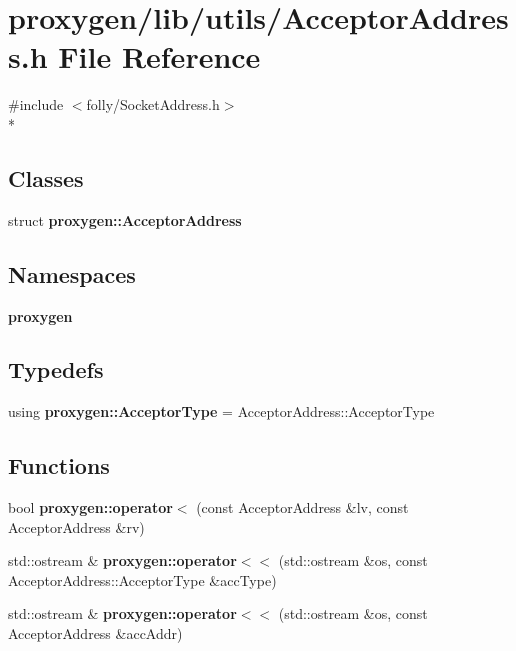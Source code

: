 \section{proxygen/lib/utils/\+Acceptor\+Address.h File Reference}
\label{AcceptorAddress_8h}
{\ttfamily \#include $<$folly/\+Socket\+Address.\+h$>$}\\*
\subsection*{Classes}
\begin{DoxyCompactItemize}
\item 
struct {\bf proxygen\+::\+Acceptor\+Address}
\end{DoxyCompactItemize}
\subsection*{Namespaces}
\begin{DoxyCompactItemize}
\item 
 {\bf proxygen}
\end{DoxyCompactItemize}
\subsection*{Typedefs}
\begin{DoxyCompactItemize}
\item 
using {\bf proxygen\+::\+Acceptor\+Type} = Acceptor\+Address\+::\+Acceptor\+Type
\end{DoxyCompactItemize}
\subsection*{Functions}
\begin{DoxyCompactItemize}
\item 
bool {\bf proxygen\+::operator$<$} (const Acceptor\+Address \&lv, const Acceptor\+Address \&rv)
\item 
std\+::ostream \& {\bf proxygen\+::operator$<$$<$} (std\+::ostream \&os, const Acceptor\+Address\+::\+Acceptor\+Type \&acc\+Type)
\item 
std\+::ostream \& {\bf proxygen\+::operator$<$$<$} (std\+::ostream \&os, const Acceptor\+Address \&acc\+Addr)
\end{DoxyCompactItemize}
